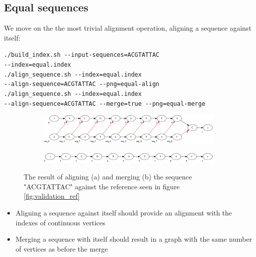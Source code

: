 \documentclass[thesis.tex]{subfiles}
\begin{document}
\subsection*{Equal sequences}
We move on the the most trivial alignment operation, aligning a sequence against itself:\\
\par\noindent
\texttt{./build\_index.sh -{}-input-sequences=ACGTATTAC\\
-{}-index=equal.index}\\
\texttt{./align\_sequence.sh -{}-index=equal.index\\
-{}-align-sequence=ACGTATTAC -{}-png=equal-align}\\
\texttt{./align\_sequence.sh -{}-index=equal.index\\
-{}-align-sequence=ACGTATTAC -{}-merge=true -{}-png=equal-merge}\\
\begin{figure}[!h]
  \begin{mdframed}
  \begin{subfigure}[t]{\textwidth}
      \includegraphics[width=\textwidth]{output/equal-align.png}
    \subcaption{}
  \end{subfigure}
  \begin{subfigure}[t]{\textwidth}
      \includegraphics[width=\textwidth]{output/equal-merge.png}
    \subcaption{}
  \end{subfigure} 
  \end{mdframed}
  \caption[Aligning and merging an equal sequence into \ref{fig:validation_ref}]{The result of aligning (a) and merging (b) the sequence "ACGTATTAC" against the reference seen in figure \ref{fig:validation_ref}}
  \label{fig:validation_equal}
\end{figure}
\begin{itemize}
\item Aligning a sequence against itself should provide an alignment with the indexes of continuous vertices
\item Merging a sequence with itself should result in a graph with the same number of vertices as before the merge
\end{itemize}
\clearpage
\end{document}

